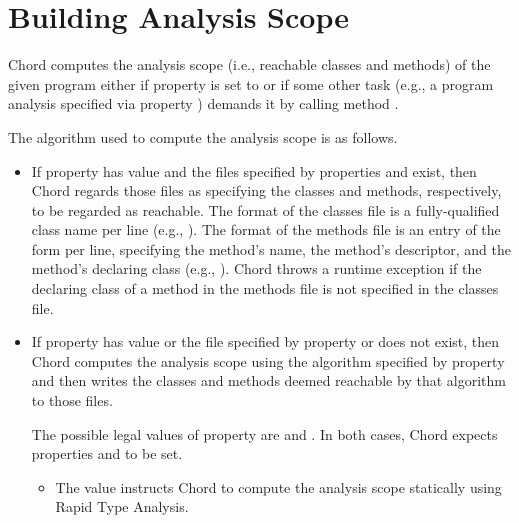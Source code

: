 \section{Building Analysis Scope}
\label{sec:building-scope}

Chord computes the analysis scope (i.e., reachable classes and methods) of the given program
either if property  is set to  or if some other task (e.g.,
a program analysis specified via property ) demands it by
calling method .

The algorithm used to compute the analysis scope is as follows.

\begin{itemize}
\item
If property  has value  and the files specified by properties
 and  exist,
then Chord regards those files as specifying the classes and methods, respectively,
to be regarded as reachable.  The format
of the classes file is a fully-qualified class name per line (e.g., ).  The format
of the methods file is an entry of the form  per line,
specifying the method's name, the method's descriptor, and the method's declaring class
(e.g., \code{main:([Ljava/lang/String;)V@foo.bar.Main}).
Chord throws a runtime exception if the declaring class of a method in the methods file is not
specified in the classes file.

\item
If property  has value  or the file specified by
property  or  does not exist,
then Chord computes the analysis scope
using the algorithm specified by property  and then
writes the classes and methods deemed reachable by that algorithm to those files.

The possible legal values of property  are  and .
In both cases, Chord expects properties  and 
to be set.

\begin{itemize}
\item
The  value instructs Chord to compute the analysis scope statically using Rapid Type Analysis.


\end{itemize}
\end{itemize}

